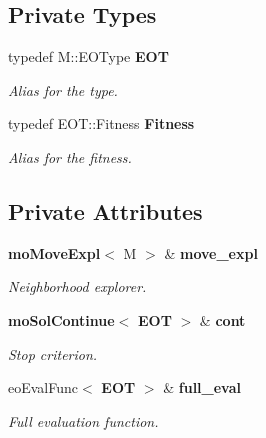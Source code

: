 \subsection*{Private Types}
\begin{CompactItemize}
\item 
typedef M::EOType {\bf EOT}\label{classmo_t_s_90d19d468c12ab5bd796948ce1ce79b1}

\begin{CompactList}\small\item\em Alias for the type. \item\end{CompactList}\item 
typedef EOT::Fitness {\bf Fitness}\label{classmo_t_s_aa0eefbb17111422e495d1255f876fca}

\begin{CompactList}\small\item\em Alias for the fitness. \item\end{CompactList}\end{CompactItemize}
\subsection*{Private Attributes}
\begin{CompactItemize}
\item 
{\bf mo\-Move\-Expl}$<$ M $>$ \& {\bf move\_\-expl}\label{classmo_t_s_06914ddc90ca96e9158c8dbe182a7865}

\begin{CompactList}\small\item\em Neighborhood explorer. \item\end{CompactList}\item 
{\bf mo\-Sol\-Continue}$<$ {\bf EOT} $>$ \& {\bf cont}\label{classmo_t_s_969371cd2202f3d29cbb426f57ac7d3a}

\begin{CompactList}\small\item\em Stop criterion. \item\end{CompactList}\item 
eo\-Eval\-Func$<$ {\bf EOT} $>$ \& {\bf full\_\-eval}\label{classmo_t_s_fb67eddae5d0bfca4ed881995523231e}

\begin{CompactList}\small\item\em Full evaluation function. \item\end{CompactList}\end{CompactItemize}
